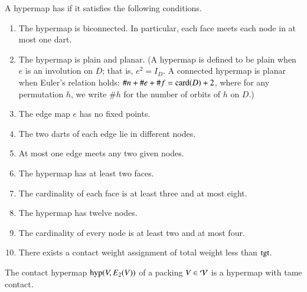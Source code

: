 \documentclass{llncs}
\def\op#1{{\hbox{#1}}}
\begin{document}
\begin{definition}
  A hypermap has  if it satisfies the following 
  conditions.
%
%
%
%
%
%
%
%
%
\begin{enumerate}
\item {} The hypermap is biconnected.  In particular,
  each face meets each node in at most one dart.
\item {} The hypermap is plain and planar.  (A hypermap is defined
to be plain when $e$ is an involution on $D$; that is, $e^2 = I_D$. A connected hypermap
is planar when Euler's relation holds: $\#n + \#e + \#f = \card(D) + 2$, where 
for any permutation $h$, we write $\#h$ for
the number of orbits of $h$ on $D$.)
\item {} The edge map $e$ has no fixed points.
\item {} The two darts of each edge lie in different
  nodes.
\item {} At most one edge meets any two given
  nodes.
\item {} The hypermap has at least two faces.
\item {} The cardinality of each face is at least three
  and at most eight.
\item {} The hypermap has twelve nodes.
\item {} The cardinality of every node is at least two  and at most four.
\item {} There exists a contact weight assignment of total
  weight less than $\op{tgt}$.
\end{enumerate}
%
\end{definition}



\begin{theorem} The contact hypermap $\op{hyp}(V,E_2(V))$ of a 
  packing $V\in {\mathcal V}$ is a hypermap with tame contact.
\end{theorem}
%
%
%
\end{document}
